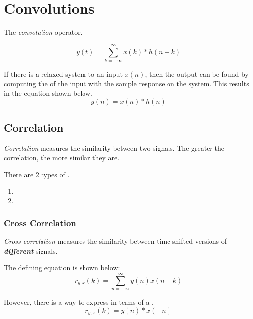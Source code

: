 \section{Convolutions}\label{sec:Convolutions}
\begin{definition}[Convolution]\label{def:Convolution}
  The \emph{convolution} operator.

  \begin{equation}\label{eq:Convolution}
    y(t) = \sum\limits_{k=-\infty}^{\infty} x(k) * h(n-k)
  \end{equation}
\end{definition}

If there is a relaxed  system to an input $x(n)$, then the output can be found by computing the  of the input with the sample response on the system.
This results in the equation shown below.
\begin{equation}\label{eq:LTI_System_Convolution}
  y(n) = x(n) * h(n)
\end{equation}

\subsection{Correlation}\label{subsec:Correlation}
\begin{definition}[Correlation]\label{def:Correlation}
  \emph{Correlation} measures the similarity between two signals.
  The greater the correlation, the more similar they are.

  There are 2 types of .
  \begin{enumerate}[noitemsep]
  \item {}
  \item {}
  \end{enumerate}
\end{definition}

\subsubsection{Cross Correlation}\label{subsubsec:Cross_Correlation}
\begin{definition}\label{def:Cross_Correlation}
  \emph{Cross correlation} measures the similarity between time shifted versions of \textbf{\emph{different}} signals.

  The defining equation is shown below:
  \begin{equation}\label{eq:Cross_Correlation}
    r_{y,x}(k) = \sum\limits_{n=-\infty}^{\infty} y(n) x(n-k)
  \end{equation}

  However, there is a way to express  in terms of a .
  \begin{equation}\label{eq:Cross_Correlation-Convolution}
    r_{y,x}(k) = y(n) * x(-n)
  \end{equation}
\end{definition}

